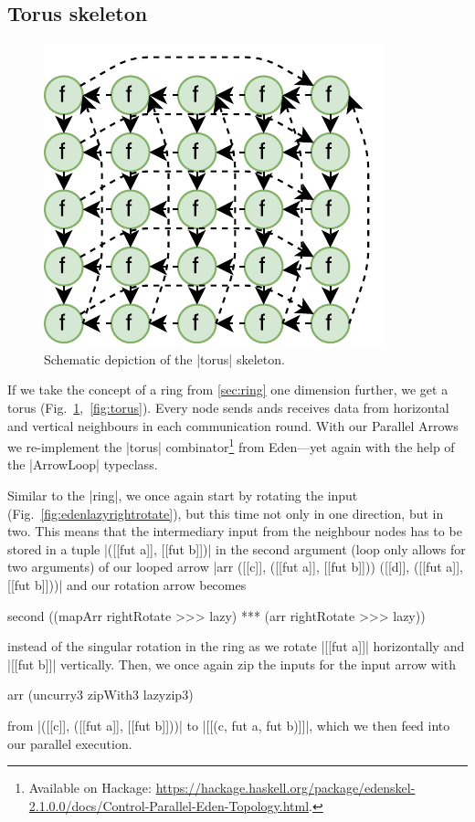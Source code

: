 \subsection{Torus skeleton}
\begin{figure}
	\includegraphics[scale=0.75]{images/torus}
	\caption{Schematic depiction of the |torus| skeleton.}
	\label{fig:ringTorusImg}
\end{figure}
If we take the concept of a ring from \ref{sec:ring} one dimension further, we get a torus (Fig.~\ref{fig:ringTorusImg},~\ref{fig:torus}). Every node sends ands receives data from horizontal and vertical neighbours in each communication round.
With our Parallel Arrows we re-implement the |torus| combinator\footnote{Available on Hackage: \url{https://hackage.haskell.org/package/edenskel-2.1.0.0/docs/Control-Parallel-Eden-Topology.html}.} from Eden---yet again with the help of the |ArrowLoop| typeclass.

Similar to the |ring|, we once again start by rotating the input (Fig.~\ref{fig:edenlazyrightrotate}), but this time not only in one direction, but in two. This means that the intermediary input from the neighbour nodes has to be stored in a tuple |([[fut a]], [[fut b]])| in the second argument (loop only allows for two arguments) of our looped arrow |arr ([[c]], ([[fut a]], [[fut b]])) ([[d]], ([[fut a]], [[fut b]]))| and our rotation arrow becomes 
\begin{code}
second ((mapArr rightRotate >>> lazy) *** (arr rightRotate >>> lazy))
\end{code}
instead of the singular rotation in the ring as we rotate |[[fut a]]| horizontally and |[[fut b]]| vertically. Then, we once again zip the inputs for the input arrow with 
\begin{code}
arr (uncurry3 zipWith3 lazyzip3)
\end{code}
from |([[c]], ([[fut a]], [[fut b]]))| to |[[(c, fut a, fut b)]]|, which we then feed into our parallel execution.

